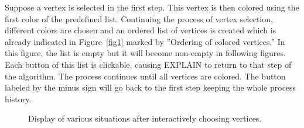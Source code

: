 \documentclass[12pt, twoside,a4paper,toc=bibliography]{scrbook}
\newcommand{\figref}[1]{Figure~\protect\ref{#1}}
\begin{document}
Suppose a vertex is selected in the first step. 
This vertex is then colored using the first color of the predefined list. 
Continuing the process of vertex selection, 
different colors are chosen and an ordered list of vertices is created 
which is already indicated in \figref{fig1} marked by ''Ordering of colored vertices.'' 
In this figure, the list is empty but it will become non-empty in following figures. 
Each button of this list is clickable, causing \mbox{EXPLAIN} to return to that step of the algorithm. 
The process continues until all vertices are colored. 
The button labeled by the minus sign will go back to the first step keeping the whole process history.


\begin{figure}
\centering
{}
\centering
{}
\centering
{}
\centering
{}
\caption{Display of various situations after interactively choosing vertices.}
\label{algorihtm}
\end{figure}
\end{document}
